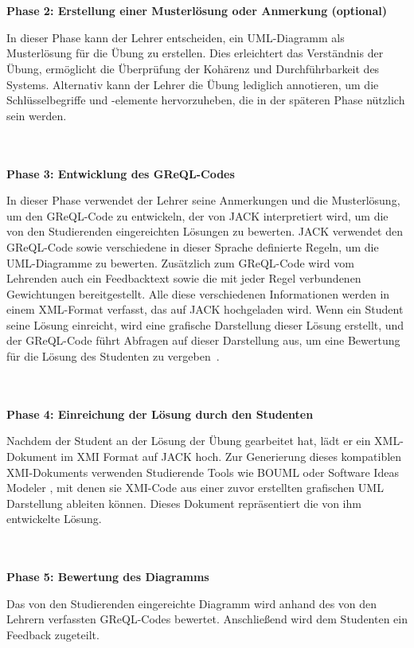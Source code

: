 \\~\\
\textbf{Phase 2: Erstellung einer Musterlösung oder Anmerkung (optional)}

In dieser Phase kann der Lehrer entscheiden, ein UML-Diagramm als Musterlösung für die Übung zu erstellen. Dies erleichtert das Verständnis der Übung, ermöglicht die Überprüfung der Kohärenz und Durchführbarkeit des Systems. Alternativ kann der Lehrer die Übung lediglich annotieren, um die Schlüsselbegriffe und -elemente hervorzuheben, die in der späteren Phase nützlich sein werden.

\\~\\
\textbf{Phase 3: Entwicklung des GReQL-Codes}

In dieser Phase verwendet der Lehrer seine Anmerkungen und die Musterlösung, um den GReQL-Code zu entwickeln, der von
JACK interpretiert wird, um die von den Studierenden eingereichten Lösungen zu bewerten. JACK verwendet den GReQL-Code
sowie verschiedene in dieser Sprache definierte Regeln, um die UML-Diagramme zu bewerten. Zusätzlich zum GReQL-Code wird
vom Lehrenden auch ein Feedbacktext sowie die mit jeder Regel verbundenen Gewichtungen bereitgestellt. Alle diese
verschiedenen Informationen werden in einem XML-Format verfasst, das auf JACK hochgeladen wird. Wenn ein Student seine
Lösung einreicht, wird eine grafische Darstellung dieser Lösung erstellt, und der GReQL-Code führt Abfragen auf dieser
Darstellung aus, um eine Bewertung für die Lösung des Studenten zu vergeben~\cite{striewe2011automated}.

\\~\\
\textbf{Phase 4: Einreichung der Lösung durch den Studenten}

Nachdem der Student an der Lösung der Übung gearbeitet hat, lädt er ein XML-Dokument im XMI Format auf JACK hoch. Zur Generierung dieses kompatiblen XMI-Dokuments verwenden Studierende Tools wie BOUML \cite{bouml} oder Software Ideas Modeler \cite{sim}, mit denen sie XMI-Code aus einer zuvor erstellten grafischen UML Darstellung ableiten können. Dieses Dokument repräsentiert die von ihm entwickelte Lösung.

\\~\\
\textbf{Phase 5: Bewertung des Diagramms}

Das von den Studierenden eingereichte Diagramm wird anhand des von den Lehrern verfassten GReQL-Codes bewertet. Anschließend wird dem Studenten ein Feedback zugeteilt.


